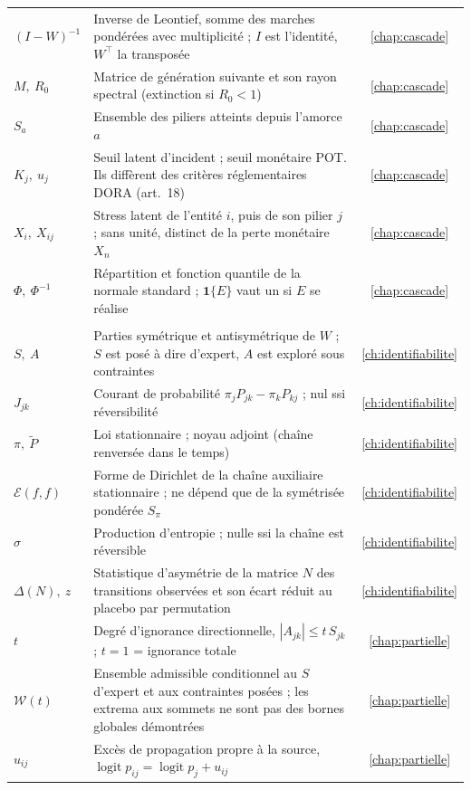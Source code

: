 {\begin{longtable}{>{\raggedright}p{3.3cm} >{\raggedright\arraybackslash}p{10.2cm} c}
$(I-W)^{-1}$ & Inverse de Leontief, somme des marches pondérées avec multiplicité ; $I$ est l'identité, $W^\top$ la transposée & \ref{chap:cascade} \\
$M,\ R_0$ & Matrice de génération suivante et son rayon spectral (extinction si $R_0<1$) & \ref{chap:cascade} \\
$S_a$ & Ensemble des piliers atteints depuis l'amorce $a$ & \ref{chap:cascade} \\
$K_j,\ u_j$ & Seuil latent d'incident ; seuil monétaire POT. Ils diffèrent des critères réglementaires DORA (art.~18) & \ref{chap:cascade} \\
$X_i,\ X_{ij}$ & Stress latent de l'entité $i$, puis de son pilier $j$ ; sans unité, distinct de la perte monétaire $X_n$ & \ref{chap:cascade} \\
$\Phi,\ \Phi^{-1}$ & Répartition et fonction quantile de la normale standard ; $\mathbf 1\{E\}$ vaut un si $E$ se réalise & \ref{chap:cascade} \\
\midrule
\multicolumn{3}{@{}l}{\emph{\textcolor{navy}{Identifiabilité et identification partielle}}} \\
$S,\ A$ & Parties symétrique et antisymétrique de $W$ ; $S$ est posé à dire d'expert, $A$ est exploré sous contraintes & \ref{ch:identifiabilite} \\
$J_{jk}$ & Courant de probabilité $\pi_jP_{jk}-\pi_kP_{kj}$ ; nul ssi réversibilité & \ref{ch:identifiabilite} \\
$\pi,\ \tilde P$ & Loi stationnaire ; noyau adjoint (chaîne renversée dans le temps) & \ref{ch:identifiabilite} \\
$\mathcal{E}(f,f)$ & Forme de Dirichlet de la chaîne auxiliaire stationnaire ; ne dépend que de la symétrisée pondérée $S_\pi$ & \ref{ch:identifiabilite} \\
$\sigma$ & Production d'entropie ; nulle ssi la chaîne est réversible & \ref{ch:identifiabilite} \\
$\Delta(N),\ z$ & Statistique d'asymétrie de la matrice $N$ des transitions observées et son écart réduit au placebo par permutation & \ref{ch:identifiabilite} \\
$t$ & Degré d'ignorance directionnelle, $|A_{jk}|\le t\,S_{jk}$ ; $t=1$ = ignorance totale & \ref{chap:partielle} \\
$\mathcal{W}(t)$ & Ensemble admissible conditionnel au $S$ d'expert et aux contraintes posées ; les extrema aux sommets ne sont pas des bornes globales démontrées & \ref{chap:partielle} \\
$u_{ij}$ & Excès de propagation propre à la source, $\operatorname{logit}p_{ij}=\operatorname{logit}p_j+u_{ij}$ & \ref{chap:partielle} \\

\end{longtable}}

